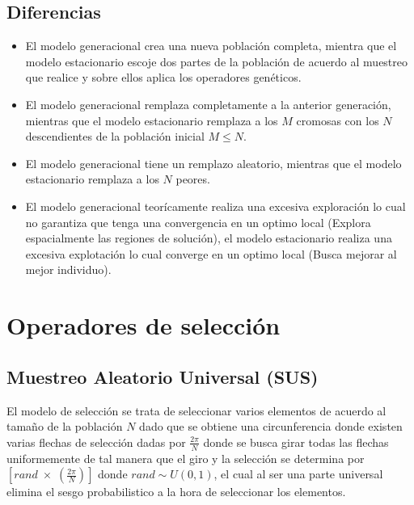 \documentclass[10pt]{article}
\begin{document}
\subsection{Diferencias}
\begin{itemize}
  \item El modelo generacional crea una nueva población completa, mientra que el modelo estacionario escoje dos partes de la población de acuerdo al muestreo que realice y sobre ellos aplica los operadores genéticos.
  \item El modelo generacional remplaza completamente a la anterior generación, mientras que el modelo estacionario remplaza a los $M$ cromosas con los $N$ descendientes de la población inicial $M\leq N$.
  \item El modelo generacional tiene un remplazo aleatorio, mientras que el modelo estacionario remplaza a los $N$ peores.
  \item El modelo generacional teorícamente realiza una excesiva exploración lo cual no garantiza que tenga una convergencia en un optimo local (Explora espacialmente las regiones de solución), el modelo estacionario realiza una excesiva explotación lo cual converge en un optimo local (Busca mejorar al mejor individuo).
\end{itemize}
\section{Operadores de selección}
\subsection{Muestreo Aleatorio Universal (SUS)}
El modelo de selección se trata de seleccionar varios elementos de acuerdo al tamaño de la población $N$ dado que se obtiene una circunferencia donde existen varias flechas de selección dadas por \(\displaystyle \frac{2\pi}{N}\) donde se busca girar todas las flechas uniformemente de tal manera que el giro y la selección se determina por \(\displaystyle \left[rand\;\times\;\left(\frac{2\pi}{N}\right)\right]\) donde \(\displaystyle rand\sim U(0,1)\), el cual al ser una parte universal elimina el sesgo probabilistico a la hora de seleccionar los elementos.
\end{document}
